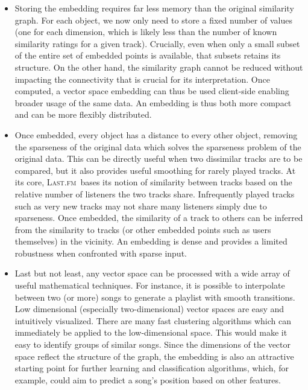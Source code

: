 \documentclass[10pt,fleqn,a4paper]{article}
\newcommand{\lastfm}{\textsc{Last.fm}}
\begin{document}
\begin{twocolumn}
\begin{itemize}
\item Storing the embedding requires far less memory than the original similarity graph. For each object, we now only need to store a fixed number of values (one for each dimension, which is likely less than the number of known similarity ratings for a given track).  Crucially, even when only a small subset of the entire set of embedded points is available, that subsets retains its structure.  On the other hand, the similarity graph cannot be reduced without impacting the connectivity that is crucial for its interpretation.  Once computed, a vector space embedding can thus be used client-side enabling broader usage of the same data.  An embedding is thus both more compact and can be more flexibly distributed.

\item Once embedded, every object has a distance to every other object, removing the sparseness of the original data which solves the sparseness problem of the original data.  This can be directly useful when two dissimilar tracks are to be compared, but it also provides useful smoothing for rarely played tracks.  At its core, \lastfm~bases its notion of similarity between tracks based on the relative number of listeners the two tracks share.  Infrequently played tracks such as very new tracks may not share many listeners simply due to sparseness.  Once embedded, the similarity of a track to others can be inferred from the similarity to tracks (or other embedded points such as users themselves) in the vicinity.  An embedding is dense and provides a limited robustness when confronted with sparse input.

\item Last but not least, any vector space can be processed with a wide array of useful mathematical techniques.  For instance, it is possible to interpolate between two (or more) songs to generate a playlist with smooth transitions.  Low dimensional (especially two-dimensional) vector spaces are easy and intuitively visualized.  There are many fast clustering algorithms which can immediately be applied to the low-dimensional space.  This would make it easy to identify groups of similar songs.  Since the dimensions of the vector space reflect the structure of the graph, the embedding is also an attractive starting point for further learning and classification algorithms, which, for example, could aim to predict a song's position based on other features.

\end{itemize}


\end{twocolumn}
\end{document}
